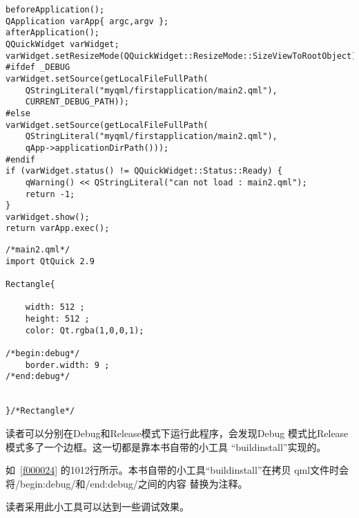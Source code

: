 \FloatBarrier
\begin{lstlisting}[label=f000021,
caption=GoodLuck,
title=\lstlistingname\ \thelstlisting\marginnote{\fbox{\footnotesize{\lstlistingname\ \thelstlisting}}}
,firstnumber=90]
beforeApplication();
QApplication varApp{ argc,argv };
afterApplication();
QQuickWidget varWidget;
varWidget.setResizeMode(QQuickWidget::ResizeMode::SizeViewToRootObject);
#ifdef _DEBUG
varWidget.setSource(getLocalFileFullPath(
    QStringLiteral("myqml/firstapplication/main2.qml"),
    CURRENT_DEBUG_PATH));
#else
varWidget.setSource(getLocalFileFullPath(
    QStringLiteral("myqml/firstapplication/main2.qml"),
    qApp->applicationDirPath()));
#endif
if (varWidget.status() != QQuickWidget::Status::Ready) {
    qWarning() << QStringLiteral("can not load : main2.qml");
    return -1;
}
varWidget.show();
return varApp.exec();
\end{lstlisting}          %
\FloatBarrier
\begin{lstlisting}[label=f000024,
caption=GoodLuck,
title=\lstlistingname\ \thelstlisting\marginnote{\fbox{\footnotesize{\lstlistingname\ \thelstlisting}}}
]
/*main2.qml*/
import QtQuick 2.9

Rectangle{

    width: 512 ;
    height: 512 ;
    color: Qt.rgba(1,0,0,1);

/*begin:debug*/
    border.width: 9 ;
/*end:debug*/


}/*Rectangle*/
\end{lstlisting}          %

读者可以分别在Debug和Release模式下运行此程序，会发现Debug
模式比Release模式多了一个边框。这一切都是靠本书自带的小工具
“build\underline{\hspace{0.5em}}install”实现的。

如\lstlistingname\ \ref{f000024}
的10\raisebox{0.16ex}{\sourcefonttwo\~{}}12行所示。本书自带的小工具“build\underline{\hspace{0.5em}}install”在拷贝
qml文件时会将/\raisebox{-0.35ex}{\sourcefonttwo{}*}begin:debug\raisebox{-0.35ex}{\sourcefonttwo{}*}/和/\raisebox{-0.35ex}{\sourcefonttwo{}*}end:debug\raisebox{-0.35ex}{\sourcefonttwo{}*}/之间的内容
替换为注释。

读者采用此小工具可以达到一些调试效果。

